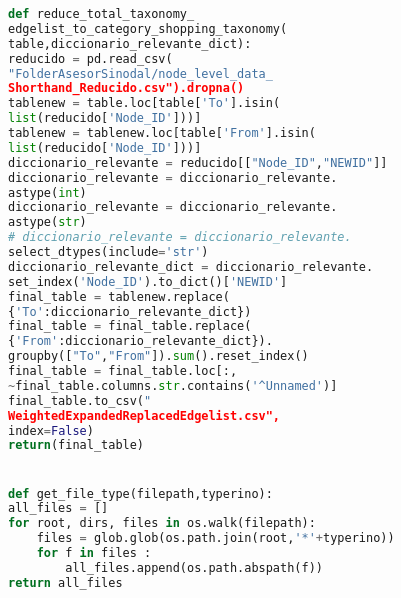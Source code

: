 \begin{lstlisting}[language=Python]
def reduce_total_taxonomy_
edgelist_to_category_shopping_taxonomy(
table,diccionario_relevante_dict):
reducido = pd.read_csv(
"FolderAsesorSinodal/node_level_data_
Shorthand_Reducido.csv").dropna()
tablenew = table.loc[table['To'].isin(
list(reducido['Node_ID']))]
tablenew = tablenew.loc[table['From'].isin(
list(reducido['Node_ID']))]
diccionario_relevante = reducido[["Node_ID","NEWID"]]
diccionario_relevante = diccionario_relevante.
astype(int)
diccionario_relevante = diccionario_relevante.
astype(str)
# diccionario_relevante = diccionario_relevante.
select_dtypes(include='str')
diccionario_relevante_dict = diccionario_relevante.
set_index('Node_ID').to_dict()['NEWID']
final_table = tablenew.replace(
{'To':diccionario_relevante_dict})
final_table = final_table.replace(
{'From':diccionario_relevante_dict}).
groupby(["To","From"]).sum().reset_index()
final_table = final_table.loc[:,
~final_table.columns.str.contains('^Unnamed')]
final_table.to_csv("
WeightedExpandedReplacedEdgelist.csv",
index=False)
return(final_table)


def get_file_type(filepath,typerino):
all_files = []
for root, dirs, files in os.walk(filepath):
    files = glob.glob(os.path.join(root,'*'+typerino))
    for f in files :
        all_files.append(os.path.abspath(f))
return all_files



\end{lstlisting}
